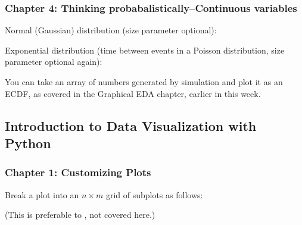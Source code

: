 \documentclass[letterpaper,10pt,english]{sphinxmanual}
\begin{document}
\subsubsection{Chapter 4: Thinking probabalistically–Continuous variables}
\label{\detokenize{big-cheat-sheet:chapter-4-thinking-probabalistically-continuous-variables}}
Normal (Gaussian) distribution (size parameter optional):

\begin{sphinxVerbatim}[commandchars=\\\{\}]
      
\end{sphinxVerbatim}

Exponential distribution (time between events in a Poisson distribution,
size parameter optional again):

\begin{sphinxVerbatim}[commandchars=\\\{\}]
     
\end{sphinxVerbatim}

You can take an array of numbers generated by simulation and plot it as an ECDF, as covered in the Graphical EDA chapter, earlier in this week.


\subsection{Introduction to Data Visualization with Python}
\label{\detokenize{big-cheat-sheet:introduction-to-data-visualization-with-python}}


\subsubsection{Chapter 1: Customizing Plots}
\label{\detokenize{big-cheat-sheet:chapter-1-customizing-plots}}
Break a plot into an \(n\times m\) grid of subplots as follows:

(This is preferable to , not covered here.)
\end{document}
